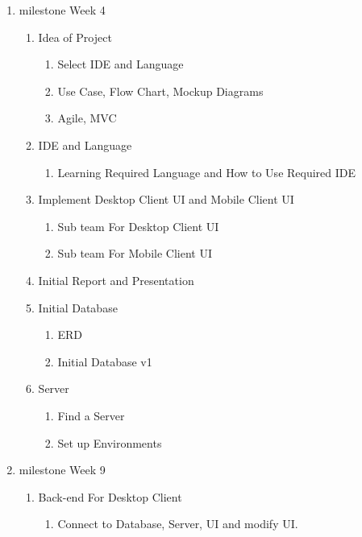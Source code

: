 \documentclass{article}
\begin{document}
	\begin{enumerate}[Level 1:]
		\item milestone Week 4
		
		\begin{enumerate}[1]
			\item Idea of Project
			\begin{enumerate}[a]
				\item Select IDE and Language
				\item Use Case, Flow Chart, Mockup Diagrams
				\item Agile, MVC
			\end{enumerate}
			\item IDE and Language
			\begin{enumerate}[a]
				\item Learning Required Language and How to Use Required IDE
			\end{enumerate}
			\item Implement Desktop Client UI and Mobile Client UI
			\begin{enumerate}[a]
				\item Sub team For Desktop Client UI
				\item Sub team For Mobile Client UI
			\end{enumerate}
			\item Initial Report and Presentation
			\item Initial Database
			\begin{enumerate}[a]
				\item ERD 
				\item Initial Database v1
			\end{enumerate}
			\item Server
			\begin{enumerate}[a]
				\item Find a Server
				\item Set up Environments
			\end{enumerate}
		\end{enumerate}
	
		\item milestone Week 9
		
		\begin{enumerate}[1]
			\item Back-end For Desktop Client
			\begin{enumerate}[a]
				\item Connect to Database, Server, UI and modify UI.
			\end{enumerate}
			

\end{enumerate}
\end{enumerate}
\end{document}
